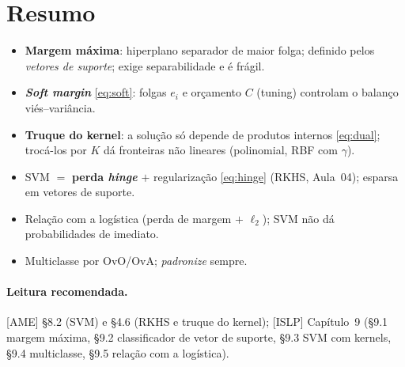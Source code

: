 \documentclass[11pt,a4paper]{article}
\begin{document}
\section*{Resumo}
\begin{itemize}[leftmargin=1.4cm]
  \item \textbf{Margem máxima}: hiperplano separador de maior folga; definido pelos
        \emph{vetores de suporte}; exige separabilidade e é frágil.
  \item \textbf{\emph{Soft margin}} \eqref{eq:soft}: folgas $e_i$ e orçamento $C$
        (tuning) controlam o balanço viés--variância.
  \item \textbf{Truque do kernel}: a solução só depende de produtos internos
        \eqref{eq:dual}; trocá-los por $K$ dá fronteiras não lineares (polinomial,
        RBF com $\gamma$).
  \item SVM $=$ \textbf{perda \emph{hinge}} $+$ regularização \eqref{eq:hinge}
        (RKHS, Aula~04); esparsa em vetores de suporte.
  \item Relação com a logística (perda de margem $+$ $\ell_2$); SVM não dá
        probabilidades de imediato.
  \item Multiclasse por OvO/OvA; \emph{padronize} sempre.
\end{itemize}

\paragraph{Leitura recomendada.} [AME] §8.2 (SVM) e §4.6 (RKHS e truque do kernel);
[ISLP] Capítulo~9 (§9.1 margem máxima, §9.2 classificador de vetor de suporte, §9.3
SVM com kernels, §9.4 multiclasse, §9.5 relação com a logística).
\end{document}
